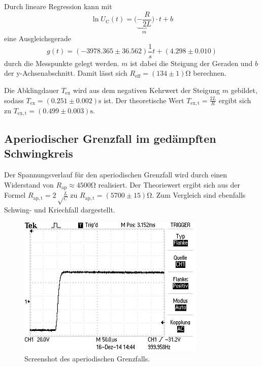 Durch lineare Regression kann mit
\begin{equation}
\ln{U_\mathup{C}}(t)=\bigl(\underbrace{-\frac{R}{2L}}_m\bigr)\cdot t +b
\end{equation}
eine Ausgleichsgerade 
\begin{equation}
g(t)=(-3978.365\pm 36.562)\frac{1}{s} t + (4.298\pm0.010)
\end{equation}
durch die Messpunkte gelegt werden. 
$m$ ist dabei die Steigung der Geraden und $b$ der y-Achsenabschnitt.
Damit lässt sich $R_\mathup{eff}=(134\pm1)\si\ohm$ berechnen. 

Die Abklingdauer $T_\mathup{ex}$ wird aus dem negativen Kehrwert der Steigung $m$ gebildet, sodass $T_\mathup{ex}=(0.251\pm0.002)\si\second$ ist.
 Der theoretische Wert $T_\mathup{ex,t}=\frac{2L}{R}$ ergibt sich zu $T_\mathup{ex,t}=(0.499\pm0.003)\si\second$.


\subsection{Aperiodischer Grenzfall im gedämpften Schwingkreis}
Der Spannungsverlauf für den aperiodischen Grenzfall wird durch einen Widerstand von $R_\mathup{ap}\approx4500\si\ohm$ realisiert. 
Der Theoriewert ergibt sich aus der Formel $R_\mathup{ap,t}=2\sqrt\frac{L}{C}$ zu $R_\mathup{ap,t}=(5700\pm15)\si\ohm$.
 Zum Vergleich sind ebenfalls Schwing- und Kriechfall dargestellt.

\begin{figure}[h]
		\centering
		\includegraphics[width=0.8\textwidth]{Bilder/Aperiodischer.JPG}
		\caption{Screenshot des aperiodischen Grenzfalls.}
\end{figure}

